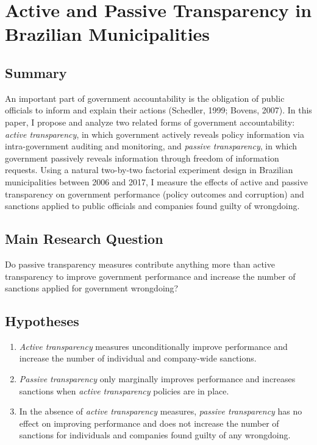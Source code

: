 \documentclass[]{article}
\title{}
\author{}
\date{}
\begin{document}
\hypertarget{title3}{%
\section{Active and Passive Transparency in Brazilian
Municipalities}\label{title3}}

\hypertarget{summary}{%
\subsection{Summary}\label{summary}}

An important part of government accountability is the obligation of
public officials to inform and explain their actions (Schedler, 1999;
Bovens, 2007). In this paper, I propose and analyze two related forms of
government accountability: \emph{active transparency}, in which
government actively reveals policy information via intra-government
auditing and monitoring, and \emph{passive transparency}, in which
government passively reveals information through freedom of information
requests. Using a natural two-by-two factorial experiment design in
Brazilian municipalities between 2006 and 2017, I measure the effects of
active and passive transparency on government performance (policy
outcomes and corruption) and sanctions applied to public officials and
companies found guilty of wrongdoing.

\hypertarget{main-research-question}{%
\subsection{Main Research Question}\label{main-research-question}}

Do passive transparency measures contribute anything more than active
transparency to improve government performance and increase the number
of sanctions applied for government wrongdoing?

\hypertarget{hypotheses}{%
\subsection{Hypotheses}\label{hypotheses}}

\begin{enumerate}
\item
  \emph{Active transparency} measures unconditionally improve
  performance and increase the number of individual and company-wide
  sanctions.
\item
  \emph{Passive transparency} only marginally improves performance and
  increases sanctions when \emph{active transparency} policies are in
  place.
\item
  In the absence of \emph{active transparency} measures, \emph{passive
  transparency} has no effect on improving performance and does not
  increase the number of sanctions for individuals and companies found
  guilty of any wrongdoing.
\end{enumerate}
\end{document}
